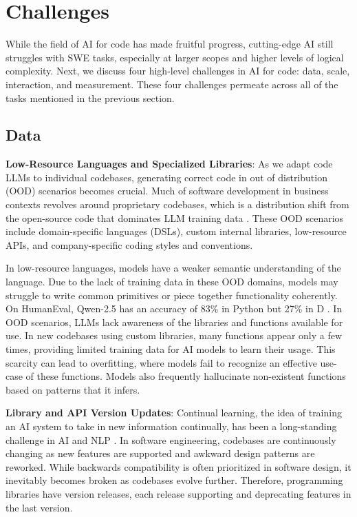 \section{Challenges} \label{sec:main-challenges}

While the field of AI for code has made fruitful progress, cutting-edge AI still struggles with SWE tasks, especially at larger scopes and higher levels of logical complexity. Next, we discuss four high-level challenges in AI for code: data, scale, interaction, and measurement. These four challenges permeate across all of the tasks mentioned in the previous section.

\subsection{Data}

\textbf{Low-Resource Languages and Specialized Libraries}: As we adapt code LLMs to individual codebases, generating correct code in out of distribution (OOD) scenarios becomes crucial. Much of software development in business contexts revolves around proprietary codebases, which is a distribution shift from the open-source code that dominates LLM training data  \citep{ahmed2024studying}. These OOD scenarios include domain-specific languages (DSLs), custom internal libraries, low-resource APIs, and company-specific coding styles and conventions.

In low-resource languages, models have a weaker semantic understanding of the language. Due to the lack of training data in these OOD domains, models may struggle to write common primitives or piece together functionality coherently. On HumanEval, Qwen-2.5 has an accuracy of 83\% in Python but 27\% in D \citep{hui2024qwen2}. In OOD scenarios, LLMs lack awareness of the libraries and functions available for use. In new codebases using custom libraries, many functions appear only a few times, providing limited training data for AI models to learn their usage. This scarcity can lead to overfitting, where models fail to recognize an effective use-case of these functions. Models also frequently hallucinate non-existent functions based on patterns that it infers.

\textbf{Library and API Version Updates}: Continual learning, the idea of training an AI system to take in new information continually, has been a long-standing challenge in AI and NLP  \citep{wu2024continual, wang2024comprehensive}. In software engineering, codebases are continuously changing as new features are supported and awkward design patterns are reworked. While backwards compatibility is often prioritized in software design, it inevitably becomes broken as codebases evolve further. Therefore, programming libraries have version releases, each release supporting and deprecating features in the last version. 

